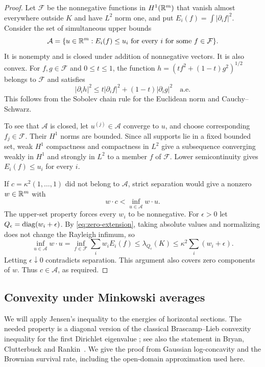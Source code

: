 \begin{proof}
Let $\mathcal F$ be the nonnegative functions in $H^1(\mathbb R^m)$ that vanish
almost everywhere outside $K$ and have $L^2$ norm one, and put
$E_i(f)=\int|\partial_i f|^2$. Consider the set of simultaneous upper bounds
\[
 \mathcal A=\{u\in\mathbb R^m:E_i(f)\le u_i\text{ for every }i
                   \text{ for some }f\in\mathcal F\}.
\]
It is nonempty and is closed under addition of nonnegative vectors. It is
also convex. For $f,g\in\mathcal F$ and $0\le t\le1$, the function
$h=(tf^2+(1-t)g^2)^{1/2}$ belongs to $\mathcal F$ and satisfies
\[
 |\partial_i h|^2\le t|\partial_i f|^2+(1-t)|\partial_i g|^2
 \quad\text{a.e.}
\]
This follows from the Sobolev chain rule for the Euclidean norm and
Cauchy--Schwarz.

To see that $\mathcal A$ is closed, let $u^{(j)}\in\mathcal A$ converge to
$u$, and choose corresponding $f_j\in\mathcal F$. Their $H^1$ norms are
bounded. Since all supports lie in a fixed bounded set, weak $H^1$
compactness and compactness in $L^2$ give a subsequence converging weakly in
$H^1$ and strongly in $L^2$ to a member $f$ of $\mathcal F$. Lower
semicontinuity gives $E_i(f)\le u_i$ for every $i$.

If $c=\kappa^2(1,\ldots,1)$ did not belong to $\mathcal A$, strict
separation would give a nonzero $w\in\mathbb R^m$ with
\[
 w\cdot c<\inf_{u\in\mathcal A}w\cdot u.
\]
The upper-set property forces every $w_i$ to be nonnegative. For $\epsilon>0$
let $Q_\epsilon=\operatorname{diag}(w_i+\epsilon)$. By \eqref{eq:zero-extension}, taking
absolute values and normalizing does not change the Rayleigh infimum, so
\[
 \inf_{u\in\mathcal A}w\cdot u
 =\inf_{f\in\mathcal F}\sum_iw_iE_i(f)
 \le\lambda_{Q_\epsilon}(K)
 \le\kappa^2\sum_i(w_i+\epsilon).
\]
Letting $\epsilon\downarrow0$ contradicts separation. This argument also
covers zero components of $w$. Thus $c\in\mathcal A$, as required.
\end{proof}

\subsection{Convexity under Minkowski averages}

We will apply Jensen's inequality to the energies of horizontal sections.
The needed property is a diagonal version of the classical
Brascamp--Lieb convexity inequality for the first Dirichlet eigenvalue
\cite[Theorem~6.2]{BrascampLieb1976}; see also the statement in
Bryan, Clutterbuck and Rankin~\cite[Theorem~1.2]{BryanClutterbuckRankin2026}.
We give the proof from Gaussian log-concavity and the Brownian survival
rate, including the open-domain approximation used here.

